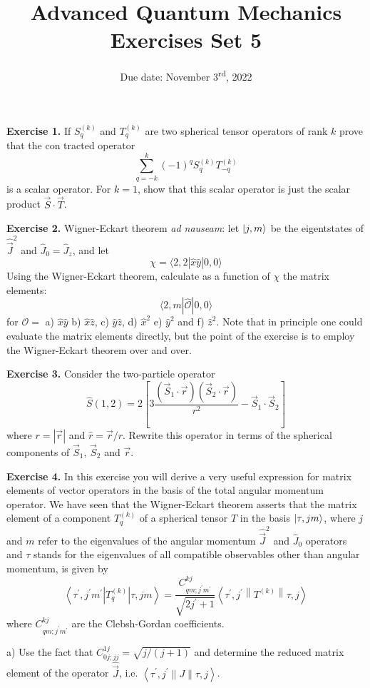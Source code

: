 \documentclass[12pt]{article}
\title{Advanced Quantum Mechanics\\Exercises Set 5\vspace{-0.5em}}
\date{Due date: November 3\textsuperscript{rd}, 2022}
\begin{document}
\maketitle


\textbf{Exercise 1.} If \(S_{q}^{(k)}\) and \(T_{q}^{(k)}\) are two spherical tensor operators of rank \(k\) prove that the con%
tracted operator
\[
\sum_{q=-k}^{k}(-1)^{q} S_{q}^{(k)} T_{-q}^{(k)}
\]
is a scalar operator. For \(k=1\), show that this scalar operator is just the scalar product \(\vec{S} \cdot \vec{T}\).


\textbf{Exercise 2.} Wigner-Eckart theorem \textit{ad nauseam}: let $\ket{j,m}$ be the eigentstates of $\hat{\vec{J}}^2$ and $\hat{J}_0 = \hat{J}_z$,
and let
\[
\chi=\langle 2,2|\hat{x} \hat{y}| 0,0\rangle
\] 
Using the Wigner-Eckart theorem, calculate as a function of $\chi$ the matrix elements:
\[
\langle 2, m|\hat{\mathcal{O}}| 0,0\rangle
\]
for $\mathcal{O} = $
a) $\hat{x}\hat{y}$ b) $\hat{x} \hat{z}$, c) $\hat{y} \hat{z}$, d) $\hat{x}^{2}$ e) $\hat{y}^{2}$ and f) $\hat{z}^{2}$.
Note that in principle one could evaluate the matrix elements
directly, but the point of the exercise is to employ the Wigner-Eckart theorem over and over.


\textbf{Exercise 3.} Consider the two-particle operator
\[
\hat{S}(1,2)=2\left[3 \frac{\left(\vec{S}_{1} \cdot \vec{r}\right)\left(\vec{S}_{2} \cdot \vec{r}\right)}{r^{2}}-\vec{S}_{1} \cdot \vec{S}_{2}\right]
\]
where $r = |\vec{r}|$ and $\hat{r} = \vec{r}/r$. Rewrite this operator in terms of the spherical components of $\vec{S}_{1}$, $\vec{S}_{2}$ and $\vec{r}$.


\textbf{Exercise 4.} In this exercise you will derive a very useful expression for matrix elements of
vector operators in the basis of the total angular momentum operator. We have seen that the
Wigner-Eckart theorem asserts that the matrix element of a component $T_q^{(k)}$ of a spherical
tensor $T$ in the basis $\ket{\tau,jm}$, where $j$ and $m$ refer to the eigenvalues of the angular momentum
$\hat{\vec{J}}^2$ and $\hat{J}_0$ operators and $\tau$ stands for the eigenvalues of all compatible observables other than
angular momentum, is given by
\[
\left\langle\tau^{\prime}, j^{\prime} m^{\prime}\left|T_{q}^{(k)}\right| \tau, j m\right\rangle=\frac{C_{q m ; j^{\prime} m^{\prime}}^{k j}}{\sqrt{2 j^{\prime}+1}}\left\langle\tau^{\prime}, j^{\prime}\left\|T^{(k)}\right\| \tau, j\right\rangle
\]
where \(C_{q m ; j^{\prime} m^{\prime}}^{k j}\) are the Clebsh-Gordan coefficients.

a) Use the fact that \(C_{0 j ; j j}^{1 j}=\sqrt{j /(j+1)}\) and determine the reduced matrix element of the
operator \(\hat{\vec{J}}\), i.e. \(\left\langle\tau^{\prime}, j^{\prime}\|J\| \tau, j\right\rangle\).
\end{document}
